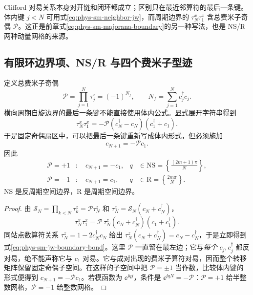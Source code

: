 Clifford 对易关系本身对开链和闭环都成立；区别只在最近邻算符的最后一条键。体内键 $j<N$ 可用式\cref{eq:phys-sm-neighbor-jw}，而周期边界的 $\tau_N^x\tau_1^x$ 含总费米子奇偶 $\mathcal P$。这正是前章式\cref{eq:phys-sm-majorana-boundary}的另一种写法，也是 NS/R 两种动量网格的来源。

\subsection{有限环边界项、NS/R 与四个费米子型迹}
\label{sec:phys-sm-finite-sectors}

定义总费米子奇偶
\begin{equation}
 \mathcal P
 =\prod_{j=1}^{N}\tau_j^z
 =(-1)^{N_f},
 \qquad
 N_f=\sum_{j=1}^{N}c_j^\dagger c_j.
 \label{eq:phys-sm-fermion-parity}
\end{equation}
横向周期自旋边界的最后一条键不能直接使用体内公式。显式展开字符串得到
\begin{equation}
 \tau_N^x\tau_1^x
 =-\mathcal P
 (c_N^\dagger-c_N)(c_1^\dagger+c_1).
 \label{eq:phys-sm-jw-boundary-bond}
\end{equation}
于是固定奇偶扇区中，可以把最后一条键重新写成体内形式，但必须施加
\begin{equation}
 c_{N+1}=-\mathcal P c_1.
 \label{eq:phys-sm-jw-boundary}
\end{equation}
因此
\begin{align}
 \mathcal P=+1 &: \quad c_{N+1}=-c_1,
 &q&\in\mathrm{NS}
 =\left\{\frac{(2m+1)\pi}{N}\right\},
 \label{eq:phys-sm-ns-momenta}\\
 \mathcal P=-1 &: \quad c_{N+1}=c_1,
 &q&\in\mathrm R
 =\left\{\frac{2m\pi}{N}\right\}.
 \label{eq:phys-sm-r-momenta}
\end{align}
NS 是反周期空间边界，R 是周期空间边界。

\begin{proof}
由 \(\mathscr S_N=\prod_{k<N}\tau_k^z=\mathcal P\tau_N^z\) 和
\(\tau_N^x=\mathscr S_N(c_N+c_N^\dagger)\)，
\[
\tau_N^x\tau_1^x
=\mathcal P\,\tau_N^z(c_N+c_N^\dagger)
(c_1+c_1^\dagger).
\]
同站点数算符关系 \(\tau_N^z=1-2c_N^\dagger c_N\) 给出
\(\tau_N^z(c_N+c_N^\dagger)=c_N-c_N^\dagger\)，于是立即得到式\cref{eq:phys-sm-jw-boundary-bond}。这里 \(\mathcal P\) 一直留在最左边；它与\emph{每个} \(c_j,c_j^\dagger\) 都反对易，绝不能声称它与 \(c_1\) 对易。它与成对出现的费米子算符对易，因而整个转移矩阵保留固定奇偶子空间。在这样的子空间中把 \(\mathcal P=\pm1\) 当作数，比较体内键的形式便得到 \(c_{N+1}=-\mathcal P c_1\)。若模函数为 \(\ee^{\ii qj}\)，条件是 \(\ee^{\ii qN}=-\mathcal P\)：\(\mathcal P=+1\) 给半整数网格，\(\mathcal P=-1\) 给整数网格。
\end{proof}

